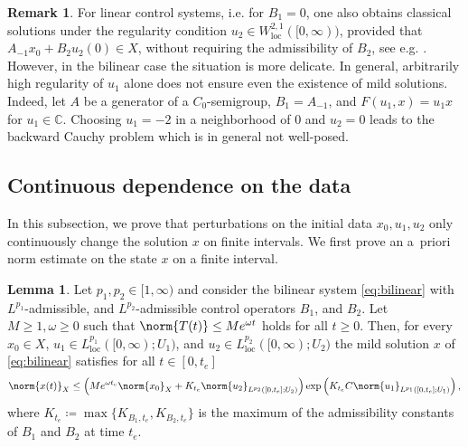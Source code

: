 \documentclass{cocv}
\newcommand{\CC}{\mathbb C}
\DeclareMathOperator{\loc}{loc}
\theoremstyle{definition}
\newtheorem{lemma}{Lemma}
\newtheorem{remark}{Remark}
\begin{document}
\begin{remark}
    For linear control systems, i.e.  for $B_1=0$, one also obtains classical solutions under the regularity condition $u_2 \in W^{2,1}_{\loc}([0,\infty))$, provided that $A_{-1}x_0 + B_2u_2(0) \in X$, without requiring the admissibility of $B_2$, see e.g. \cite[Thm.~3.8.3]{staffans2005well}.
    However, in the bilinear case the situation is more delicate. In general, arbitrarily high regularity of $u_1$ alone does not ensure even the existence of mild solutions. Indeed, let $A$ be a generator of a $C_0$-semigroup, $B_1=A_{-1}$, and $F(u_1,x)=u_1x$ for $u_1 \in \CC$. Choosing $u_1=-2$ in a neighborhood of $0$ and $u_2=0$ leads to the backward Cauchy problem which is in general not well-posed. 
\end{remark}

\subsection{Continuous dependence on the data}
In this subsection, we prove that perturbations on the initial data $x_0, u_1, u_2$ only continuously change the solution $x$ on finite intervals. We first prove an a~priori norm estimate on the state $x$ on a finite interval.

\begin{lemma}\label{lem:x_bdd_by_data}
    Let $p_1,p_2 \in [1,\infty)$ and consider the bilinear system \eqref{eq:bilinear} with $L^{p_1}$-admissible, and $L^{p_2}$-admissible control operators $B_1$, and $ B_2$. Let $M \ge 1,\omega \geq 0$ such that $\norm{T(t)} \leq Me^{\omega t}$ holds for all $t \geq 0$. Then, for every $x_0 \in X$, $u_1 \in L^{p_1}_{\loc}([0,\infty); U_1)$, and $u_2 \in L^{p_2}_{\loc}([0,\infty); U_2)$ the mild solution $x$ of \eqref{eq:bilinear} satisfies for all $t \in [0, t_e]$
\begin{equation}\label{est:x_bdd_by_data}
    \norm{x(t)}_X \leq \left(Me^{\omega t_e}\norm{x_0}_X + K_{t_e} \norm{u_2}_{L^{p_2}([0,t_e]; U_2)}\right)\exp\left(K_{t_e}C \norm{u_1}_{L^{p_1}([0,t_e];U_1)}\right),
\end{equation}
where $K_{t_e} \coloneqq \max\{K_{B_1, t_e}, K_{B_2, t_e}\}$ is the maximum of the admissibility constants of $B_1$ and $B_2$ at time $t_e$. 
\end{lemma}
\end{document}
